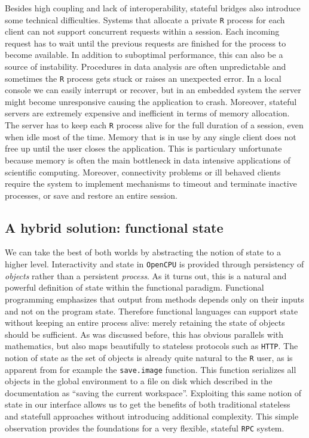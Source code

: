 \documentclass{article}
\newcommand{\R}{\texttt{R}\xspace}
\newcommand{\HTTP}{\texttt{HTTP}\xspace}
\newcommand{\RPC}{\texttt{RPC}\xspace}
\newcommand{\OpenCPU}{\texttt{OpenCPU}\xspace}
\begin{document}
Besides high coupling and lack of interoperability, stateful bridges also introduce some technical difficulties. Systems that allocate a private \R process for each client can not support concurrent requests within a session. Each incoming request has to wait until the previous requests are finished for the process to become available. In addition to suboptimal performance, this can also be a source of instability. Procedures in data analysis are often unpredictable and sometimes the \R process gets stuck or raises an unexpected error. In a local console we can easily interrupt or recover, but in an embedded system the server might become unresponsive causing the application to crash. Moreover, stateful servers are extremely expensive and inefficient in terms of memory allocation. The server has to keep each \R process alive for the full duration of a session, even when idle most of the time. Memory that is in use by any single client does not free up until the user closes the application. This is particulary unfortunate because memory is often the main bottleneck in data intensive applications of scientific computing. Moreover, connectivity problems or ill behaved clients require the system to implement mechanisms to timeout and terminate inactive processes, or save and restore an entire session.

\subsection{A hybrid solution: functional state}

We can take the best of both worlds by abstracting the notion of state to a higher level. Interactivity and state in \OpenCPU is provided through persistency of \emph{objects} rather than a persistent \emph{process}. As it turns out, this is a natural and powerful definition of state within the functional paradigm. Functional programming emphasizes that output from methods depends only on their inputs and not on the program state. Therefore functional languages can support state without keeping an entire process alive: merely retaining the state of objects should be sufficient. As was discussed before, this has obvious parallels with mathematics, but also maps beautifully to stateless protocols such as \HTTP. The notion of state as the set of objects is already quite natural to the \R user, as is apparent from for example the \texttt{save.image} function. This function serializes all objects in the global environment to a file on disk which described in the documentation as ``saving the current workspace''. Exploiting this same notion of state in our interface allows us to get the benefits of both traditional stateless and statefull approaches without introducing additional complexity. This simple observation provides the foundations for a very flexible, stateful \RPC system.
\end{document}
